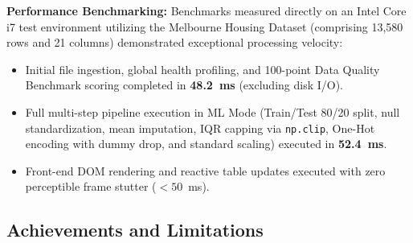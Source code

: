 \textbf{Performance Benchmarking:}
Benchmarks measured directly on an Intel Core i7 test environment utilizing the Melbourne Housing Dataset (comprising 13,580 rows and 21 columns) demonstrated exceptional processing velocity:
\begin{itemize}
  \item Initial file ingestion, global health profiling, and 100-point Data Quality Benchmark scoring completed in \textbf{48.2~ms} (excluding disk I/O).
  \item Full multi-step pipeline execution in ML Mode (Train/Test 80/20 split, null standardization, mean imputation, IQR capping via \texttt{np.clip}, One-Hot encoding with dummy drop, and standard scaling) executed in \textbf{52.4~ms}.
  \item Front-end DOM rendering and reactive table updates executed with zero perceptible frame stutter ($< 50$~ms).
\end{itemize}

\subsection{Achievements and Limitations}

